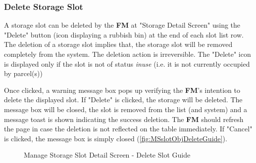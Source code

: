\subsubsection{Delete Storage Slot}
\label{subsubsec:deleteSlot}

A storage slot can be deleted by the \textbf{FM} at "Storage Detail Screen" using the "Delete" button (icon displaying a rubbish bin) at the end of each slot list row. 
The deletion of a storage slot implies that, the storage slot will be removed completely from the system. The deletion action is irreversible. 
The "Delete" icon is displayed only if the slot is not of status \textit{inuse} (i.e. it is not currently occupied by parcel(s))

Once clicked, a warning message box pops up verifying the \textbf{FM}'s intention to delete the displayed slot. If "Delete" is clicked, the storage will be deleted. The message box will be closed, the slot is removed from the list (and system) and a message toast is shown indicating the success deletion. The \textbf{FM} should refresh the page in case the deletion is not reflected on the table immediately. If "Cancel" is clicked, the message box is simply closed (\autoref{fig:MSslotObjDeleteGuide}).

\begin{figure}[H]
	\centering
  
    \vspace{1pt}
    
    \caption{Manage Storage Slot Detail Screen - Delete Slot Guide}
	\label{fig:MSslotObjDeleteGuide}
\end{figure}


